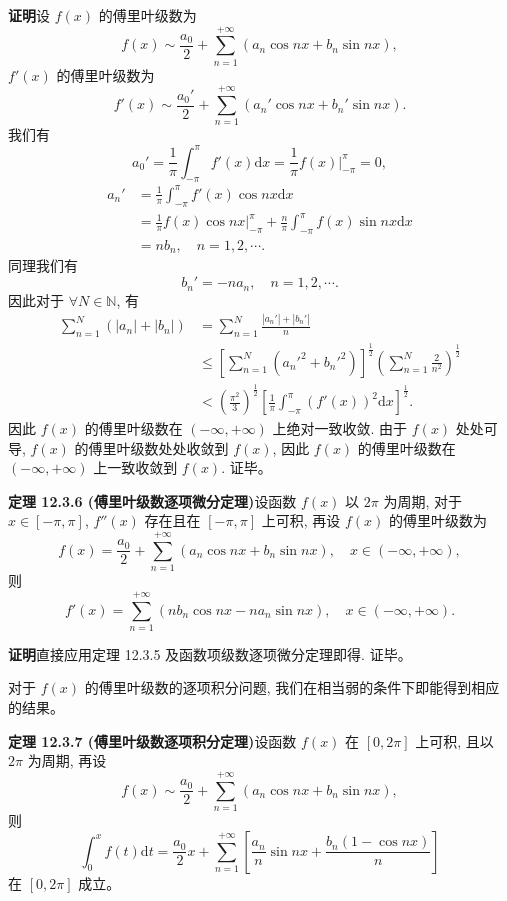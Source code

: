 \documentclass[UTF8,12pt,a4paper,fontset=fandol]{ctexart}
\begin{document}
\noindent\textbf{证明}\quad 设 $f(x)$ 的傅里叶级数为
\[
  f(x)\sim\frac{a_0}{2}+\sum_{n=1}^{+\infty}(a_n\cos nx+b_n\sin nx),
\]
$f'(x)$ 的傅里叶级数为
\[
  f'(x)\sim\frac{a_0'}{2}+\sum_{n=1}^{+\infty}(a_n'\cos nx+b_n'\sin nx).
\]
我们有
\[
  a_0'=\frac1\pi\int_{-\pi}^{\pi}f'(x)\mathrm dx
  =\frac1\pi f(x)\bigg|_{-\pi}^{\pi}=0,
\]
\[
\begin{aligned}
  a_n'
  &=\frac1\pi\int_{-\pi}^{\pi}f'(x)\cos nx\mathrm dx\\
  &=\frac1\pi f(x)\cos nx\bigg|_{-\pi}^{\pi}
    +\frac n\pi\int_{-\pi}^{\pi}f(x)\sin nx\mathrm dx\\
  &=nb_n,\quad n=1,2,\cdots.
\end{aligned}
\]
同理我们有
\[
  b_n'=-na_n,\quad n=1,2,\cdots.
\]
因此对于 $\forall N\in\mathbb N$, 有
\[
\begin{aligned}
  \sum_{n=1}^N(|a_n|+|b_n|)
  &=\sum_{n=1}^N\frac{|a_n'|+|b_n'|}{n}\\
  &\leqslant
  \left[\sum_{n=1}^N(a_n'^2+b_n'^2)\right]^{\frac12}
  \left(\sum_{n=1}^N\frac2{n^2}\right)^{\frac12}\\
  &<\left(\frac{\pi^2}{3}\right)^{\frac12}
  \left[\frac1\pi\int_{-\pi}^{\pi}(f'(x))^2\mathrm dx\right]^{\frac12}.
\end{aligned}
\]
因此 $f(x)$ 的傅里叶级数在 $(-\infty,+\infty)$ 上绝对一致收敛. 由于 $f(x)$ 处处可导, $f(x)$ 的傅里叶级数处处收敛到 $f(x)$, 因此 $f(x)$ 的傅里叶级数在 $(-\infty,+\infty)$ 上一致收敛到 $f(x)$. 证毕。

\noindent\textbf{定理 12.3.6 (傅里叶级数逐项微分定理)}\quad 设函数 $f(x)$ 以 $2\pi$ 为周期, 对于 $x\in[-\pi,\pi]$, $f''(x)$ 存在且在 $[-\pi,\pi]$ 上可积, 再设 $f(x)$ 的傅里叶级数为
\[
  f(x)=\frac{a_0}{2}+\sum_{n=1}^{+\infty}(a_n\cos nx+b_n\sin nx),\quad x\in(-\infty,+\infty),
\]
则
\[
  f'(x)=\sum_{n=1}^{+\infty}(nb_n\cos nx-na_n\sin nx),\quad x\in(-\infty,+\infty).
\]

\noindent\textbf{证明}\quad 直接应用定理 12.3.5 及函数项级数逐项微分定理即得. 证毕。

对于 $f(x)$ 的傅里叶级数的逐项积分问题, 我们在相当弱的条件下即能得到相应的结果。

\noindent\textbf{定理 12.3.7 (傅里叶级数逐项积分定理)}\quad 设函数 $f(x)$ 在 $[0,2\pi]$ 上可积, 且以 $2\pi$ 为周期, 再设
\[
  f(x)\sim\frac{a_0}{2}+\sum_{n=1}^{+\infty}(a_n\cos nx+b_n\sin nx),
\]
则
\[
  \int_0^xf(t)\mathrm dt
  =
  \frac{a_0}{2}x+\sum_{n=1}^{+\infty}
  \left[
    \frac{a_n}{n}\sin nx+\frac{b_n(1-\cos nx)}{n}
  \right]
\]
在 $[0,2\pi]$ 成立。
\end{document}
